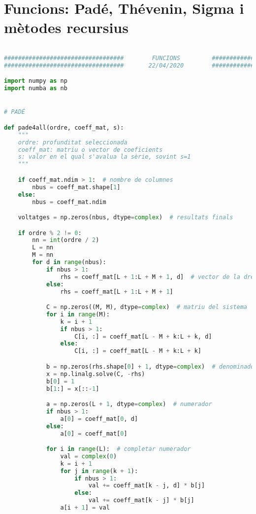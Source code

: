 \section{Funcions: Padé, Thévenin, Sigma i mètodes recursius}
\begin{lstlisting}[language=Python,numbers=none]

##################################        FUNCIONS         ###################################
##################################       22/04/2020        ###################################

import numpy as np
import numba as nb


# PADÉ

def pade4all(ordre, coeff_mat, s):
    """
    ordre: profunditat seleccionada
    coeff_mat: matriu o vector de coeficients
    s: valor en el qual s'avalua la sèrie, sovint s=1
    """

    if coeff_mat.ndim > 1:  # nombre de columnes
        nbus = coeff_mat.shape[1]
    else:
        nbus = coeff_mat.ndim

    voltatges = np.zeros(nbus, dtype=complex)  # resultats finals

    if ordre % 2 != 0:
        nn = int(ordre / 2)
        L = nn
        M = nn
        for d in range(nbus):
            if nbus > 1:
                rhs = coeff_mat[L + 1:L + M + 1, d]  # vector de la dreta, conegut
            else:
                rhs = coeff_mat[L + 1:L + M + 1]

            C = np.zeros((M, M), dtype=complex)  # matriu del sistema
            for i in range(M):
                k = i + 1
                if nbus > 1:
                    C[i, :] = coeff_mat[L - M + k:L + k, d]
                else:
                    C[i, :] = coeff_mat[L - M + k:L + k]

            b = np.zeros(rhs.shape[0] + 1, dtype=complex)  # denominador
            x = np.linalg.solve(C, -rhs)
            b[0] = 1
            b[1:] = x[::-1]

            a = np.zeros(L + 1, dtype=complex)  # numerador
            if nbus > 1:
                a[0] = coeff_mat[0, d]
            else:
                a[0] = coeff_mat[0]

            for i in range(L):  # completar numerador
                val = complex(0)
                k = i + 1
                for j in range(k + 1):
                    if nbus > 1:
                        val += coeff_mat[k - j, d] * b[j]
                    else:
                        val += coeff_mat[k - j] * b[j]
                a[i + 1] = val


\end{lstlisting}
